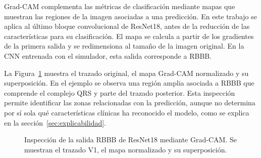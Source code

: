 Grad-CAM complementa las métricas de clasificación mediante mapas que muestran las regiones de la imagen asociadas a una predicción. En este trabajo se aplica al último bloque convolucional de ResNet18, antes de la reducción de las características para su clasificación. El mapa se calcula a partir de los gradientes de la primera salida y se redimensiona al tamaño de la imagen original. En la CNN entrenada con el simulador, esta salida corresponde a RBBB.

\begin{samepage}
La Figura~\ref{fig:gradcam_sintetico_modelos} muestra el trazado original, el mapa Grad-CAM normalizado y su superposición. En el ejemplo se observa una región amplia asociada a RBBB que comprende el complejo QRS y parte del trazado posterior. Esta inspección permite identificar las zonas relacionadas con la predicción, aunque no determina por sí sola qué características clínicas ha reconocido el modelo, como se explica en la sección~\ref{sec:explicabilidad}.
\par
\end{samepage}

\begin{figure}[H]
  \centering
  \caption{Inspección de la salida RBBB de ResNet18 mediante Grad-CAM. Se muestran el trazado V1, el mapa normalizado y su superposición.}
  \label{fig:gradcam_sintetico_modelos}
\end{figure}
